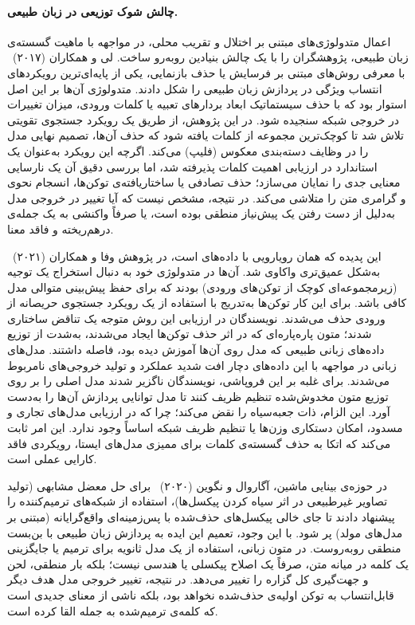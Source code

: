 \paragraph{چالش شوک توزیعی در زبان طبیعی.}

اعمال متدولوژی‌های مبتنی بر اختلال و تقریب محلی، در مواجهه با ماهیت گسسته‌ی زبان طبیعی، پژوهشگران را با یک چالش بنیادین روبه‌رو ساخت. لی و همکاران (۲۰۱۷)~\cite{li2017understanding} با معرفی روش‌های مبتنی بر فرسایش یا حذف بازنمایی، یکی از پایه‌ای‌ترین رویکردهای انتساب ویژگی در پردازش زبان طبیعی را شکل دادند. متدولوژی آن‌ها بر این اصل استوار بود که با حذف سیستماتیک ابعاد بردارهای تعبیه یا کلمات ورودی، میزان تغییرات در خروجی شبکه سنجیده شود. در این پژوهش، از طریق یک رویکرد جستجوی تقویتی تلاش شد تا کوچک‌ترین مجموعه از کلمات یافته شود که حذف آن‌ها، تصمیم نهایی مدل را در وظایف دسته‌بندی معکوس (فلیپ) می‌کند. اگرچه این رویکرد به‌عنوان یک استاندارد در ارزیابی اهمیت کلمات پذیرفته شد، اما بررسی دقیق آن یک نارسایی معنایی جدی را نمایان می‌سازد؛ حذف تصادفی یا ساختاریافته‌ی توکن‌ها، انسجام نحوی و گرامری متن را متلاشی می‌کند. در نتیجه، مشخص نیست که آیا تغییر در خروجی مدل به‌دلیل از دست رفتن یک پیش‌نیاز منطقی بوده است، یا صرفاً واکنشی به یک جمله‌ی درهم‌ریخته و فاقد معنا.

این پدیده که همان رویارویی با داده‌های  است، در پژوهش وفا و همکاران (۲۰۲۱)~\cite{vafa2021rationales} به‌شکل عمیق‌تری واکاوی شد. آن‌ها در متدولوژی خود به دنبال استخراج یک توجیه (زیرمجموعه‌ای کوچک از توکن‌های ورودی) بودند که برای حفظ پیش‌بینی متوالی مدل کافی باشد. برای این کار توکن‌ها به‌تدریج با استفاده از یک رویکرد جستجوی حریصانه از ورودی حذف می‌شدند. نویسندگان در ارزیابی این روش متوجه یک تناقض ساختاری شدند؛ متون پاره‌پاره‌ای که در اثر حذف توکن‌ها ایجاد می‌شدند، به‌شدت از توزیع داده‌های زبانی طبیعی که مدل روی آن‌ها آموزش دیده بود، فاصله داشتند. مدل‌های زبانی در مواجهه با این داده‌های  دچار افت شدید عملکرد و تولید خروجی‌های نامربوط می‌شدند. برای غلبه بر این فروپاشی، نویسندگان ناگزیر شدند مدل اصلی را بر روی توزیع متون مخدوش‌شده تنظیم ظریف کنند تا مدل توانایی پردازش آن‌ها را به‌دست آورد. این الزام، ذات جعبه‌سیاه را نقض می‌کند؛ چرا که در ارزیابی مدل‌های تجاری و مسدود، امکان دستکاری وزن‌ها یا تنظیم ظریف شبکه اساساً وجود ندارد. این امر ثابت می‌کند که اتکا به حذف گسسته‌ی کلمات برای ممیزی مدل‌های ایستا، رویکردی فاقد کارایی عملی است.

در حوزه‌ی بینایی ماشین، آگاروال و نگوین (۲۰۲۰)~\cite{agarwal2020explaining} برای حل معضل مشابهی (تولید تصاویر غیرطبیعی در اثر سیاه کردن پیکسل‌ها)، استفاده از شبکه‌های ترمیم‌کننده را پیشنهاد دادند تا جای خالی پیکسل‌های حذف‌شده با پس‌زمینه‌ای واقع‌گرایانه (مبتنی بر مدل‌های مولد) پر شود. با این وجود، تعمیم این ایده به پردازش زبان طبیعی با بن‌بست منطقی روبه‌روست. در متون زبانی، استفاده از یک مدل ثانویه برای ترمیم یا جایگزینی یک کلمه در میانه متن، صرفاً یک اصلاح پیکسلی یا هندسی نیست؛ بلکه بار منطقی، لحن و جهت‌گیری کل گزاره را تغییر می‌دهد. در نتیجه، تغییر خروجی مدل هدف دیگر قابل‌انتساب به توکن اولیه‌ی حذف‌شده نخواهد بود، بلکه ناشی از معنای جدیدی است که کلمه‌ی ترمیم‌شده به جمله القا کرده است.

